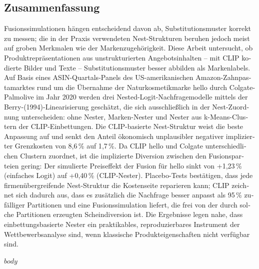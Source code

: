 \documentclass[a4paper,titlepage,liststotoc,final,oneside,openany,BCOR12mm,fontsize=12pt]{scrreprt}
\begin{document}
\begin{otherlanguage}{ngerman}
\section*{Zusammenfassung}
Fusionssimulationen h\"angen entscheidend davon ab, Substitutionsmuster korrekt
zu messen; die in der Praxis verwendeten Nest-Strukturen beruhen jedoch meist
auf groben Merkmalen wie der Markenzugeh\"origkeit. Diese Arbeit untersucht, ob
Produktrepr\"asentationen aus unstrukturierten Angebotsinhalten -- mit CLIP
kodierte Bilder und Texte -- Substitutionsmuster besser abbilden als
Markenlabels. Auf Basis eines ASIN-Quartals-Panels des US-amerikanischen
Amazon-Zahnpastamarktes rund um die \"Ubernahme der Naturkosmetikmarke hello
durch Colgate-Palmolive im Jahr 2020 werden drei Nested-Logit-Nachfragemodelle
mittels der Berry-(1994)-Linearisierung gesch\"atzt, die sich ausschlie{\ss}lich
in der Nest-Zuordnung unterscheiden: ohne Nester, Marken-Nester und Nester aus
k-Means-Clustern der CLIP-Einbettungen. Die CLIP-basierte Nest-Struktur weist
die beste Anpassung auf und senkt den Anteil \"okonomisch unplausibler negativer
implizierter Grenzkosten von 8{,}6\,\% auf 1{,}7\,\%. Da CLIP hello und Colgate
unterschiedlichen Clustern zuordnet, ist die implizierte Diversion zwischen den
Fusionsparteien gering: Der simulierte Preiseffekt der Fusion f\"ur hello sinkt
von +1{,}23\,\% (einfaches Logit) auf +0{,}40\,\% (CLIP-Nester). Placebo-Tests
best\"atigen, dass jede firmen\"ubergreifende Nest-Struktur die Kostenseite
reparieren kann; CLIP zeichnet sich dadurch aus, dass es zus\"atzlich die
Nachfrage besser anpasst als 95\,\% zuf\"alliger Partitionen und eine
Fusionssimulation liefert, die frei von der durch solche Partitionen erzeugten
Scheindiversion ist. Die Ergebnisse legen nahe, dass einbettungsbasierte Nester
ein praktikables, reproduzierbares Instrument der Wettbewerbsanalyse sind, wenn
klassische Produkteigenschaften nicht verf\"ugbar sind.
\end{otherlanguage}


\tableofcontents
\listoffigures
\listoftables

\providecommand{\frontmatter}{}
\providecommand{\mainmatter}{\cleardoublepage\pagenumbering{arabic}}
\providecommand{\backmatter}{}
\cleardoublepage
{} %

$body$
\end{document}
